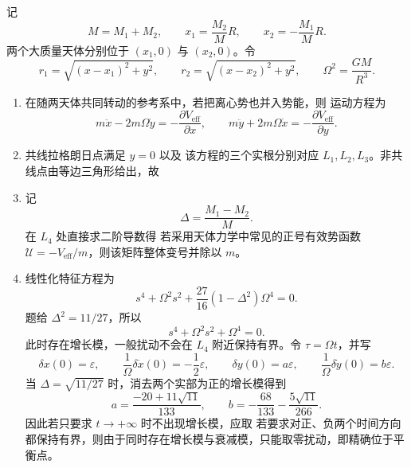 \begin{question}[受限三体问题]
\begin{solution}
记
\[
  M=M_1+M_2,
  \qquad
  x_1=\frac{M_2}{M}R,
  \qquad
  x_2=-\frac{M_1}{M}R.
\]
两个大质量天体分别位于 $(x_1,0)$ 与 $(x_2,0)$。令
\[
  r_1=\sqrt{(x-x_1)^2+y^2},
  \qquad
  r_2=\sqrt{(x-x_2)^2+y^2},
  \qquad
  \Omega^2=\frac{GM}{R^3}.
\]
\begin{enumerate}
  \item 在随两天体共同转动的参考系中，若把离心势也并入势能，则
  运动方程为
  \[
    m\ddot x-2m\Omega\dot y=-\frac{\partial V_{\mathrm{eff}}}{\partial x},
    \qquad
    m\ddot y+2m\Omega\dot x=-\frac{\partial V_{\mathrm{eff}}}{\partial y}.
  \]
  \item 共线拉格朗日点满足 $y=0$ 以及
  该方程的三个实根分别对应 $L_1,L_2,L_3$。非共线点由等边三角形给出，故
  \item 记
  \[
    \Delta=\frac{M_1-M_2}{M}.
  \]
  在 $L_4$ 处直接求二阶导数得
  若采用天体力学中常见的正号有效势函数 $\mathcal U=-V_{\mathrm{eff}}/m$，则该矩阵整体变号并除以 $m$。
  \item 线性化特征方程为
  \[
    s^4+\Omega^2s^2+\frac{27}{16}(1-\Delta^2)\Omega^4=0.
  \]
  题给 $\Delta^2=11/27$，所以
  \[
    s^4+\Omega^2s^2+\Omega^4=0.
  \]
  此时存在增长模，一般扰动不会在 $L_4$ 附近保持有界。令 $\tau=\Omega t$，并写
  \[
    \delta x(0)=\varepsilon,
    \qquad
    \frac{1}{\Omega}\delta\dot x(0)=-\frac12\varepsilon,
    \qquad
    \delta y(0)=a\varepsilon,
    \qquad
    \frac{1}{\Omega}\delta\dot y(0)=b\varepsilon .
  \]
  当 $\Delta=\sqrt{11/27}$ 时，消去两个实部为正的增长模得到
  \[
    a=\frac{-20+11\sqrt{11}}{133},
    \qquad
    b=-\frac{68}{133}-\frac{5\sqrt{11}}{266}.
  \]
  因此若只要求 $t\to+\infty$ 时不出现增长模，应取
  若要求对正、负两个时间方向都保持有界，则由于同时存在增长模与衰减模，只能取零扰动，即精确位于平衡点。
\end{enumerate}
\end{solution}

\end{question}
